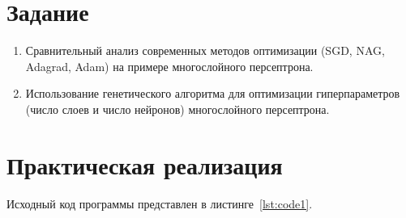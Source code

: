 \documentclass[a4paper, 14pt]{extarticle}
\begin{document}
\renewcommand{\ttdefault}{pcr}

\setlength{\tabcolsep}{3pt}
\newpage
\setcounter{page}{2}

\section{Задание}\label{Sect::task}

\begin{enumerate}
    \item Сравнительный анализ современных методов оптимизации (SGD, NAG, Adagrad, Adam) на примере многослойного персептрона.
    \item Использование генетического алгоритма для оптимизации гиперпараметров (число слоев и число нейронов) многослойного персептрона.
\end{enumerate}

\section{Практическая реализация}\label{Sect::code}

Исходный код программы представлен в листинге~\ref{lst:code1}.
\end{document}
